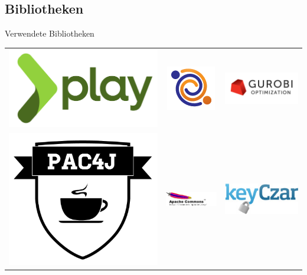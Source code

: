 \documentclass[18pt]{beamer}
\begin{document}
\subsection{Bibliotheken}
\begin{frame}{Verwendete Bibliotheken}
	\begin{tabular}{ccc}
		\includegraphics[width=0.3\linewidth, height=0.3\textheight, keepaspectratio]{bilder/play_full_color.png} &
		\includegraphics[width=0.3\linewidth, height=0.3\textheight, keepaspectratio]{bilder/ebean.png} &
		\includegraphics[width=0.3\linewidth, height=0.3\textheight, keepaspectratio]{bilder/gurobi.png}\\
		\includegraphics[width=0.3\linewidth, height=0.3\textheight, keepaspectratio]{bilder/pac4j.png}&
		\includegraphics[width=0.3\linewidth, height=0.3\textheight, keepaspectratio]{bilder/apache.png}&
		\includegraphics[width=0.3\linewidth, height=0.3\textheight, keepaspectratio]{bilder/keyczar.jpg} \\
	\end{tabular}
\end{frame}
\end{document}
